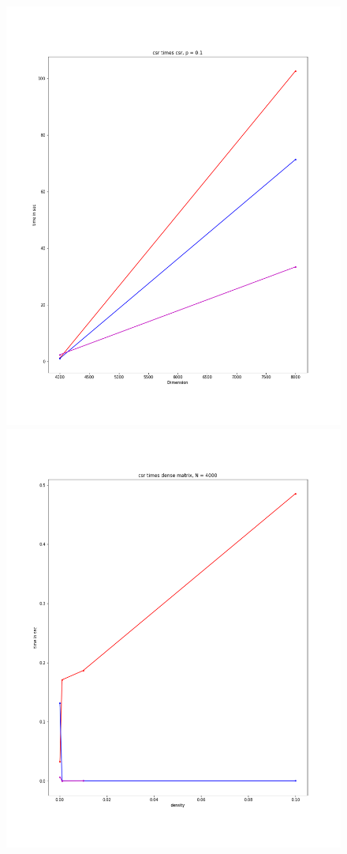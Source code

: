 \documentclass[12pt]{article}
\begin{document}
\begin{figure}[h]
  \includegraphics[scale = 0.16]{csr_csr_1.PNG}
  \includegraphics[scale = 0.16]{csr_dm_4000.png}

\end{figure}
\end{document}
